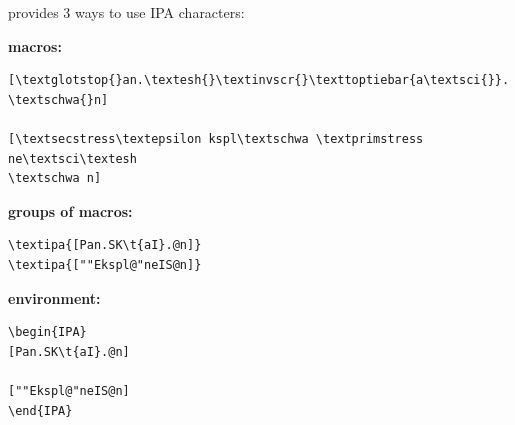 \begin{frame}[fragile]

 provides 3 ways to use IPA characters:


\textbf{macros:}

\begin{lstlisting}
[\textglotstop{}an.\textesh{}\textinvscr{}\texttoptiebar{a\textsci{}}.
\textschwa{}n]

[\textsecstress\textepsilon kspl\textschwa \textprimstress ne\textsci\textesh
\textschwa n]
\end{lstlisting}

\vspace{-.25cm}

\begin{multicols}{2}

\z 
\end{multicols}


\textbf{groups of macros:}

\vspace{-.25cm}

\begin{multicols}{2}
\begin{lstlisting}
\textipa{[Pan.SK\t{aI}.@n]} 
\textipa{[""Ekspl@"neIS@n]}
\end{lstlisting}


\ea \textipa{[Pan.SK\t{aI}.@n]}

\ex {}	
\z 	
\end{multicols}


\textbf{ environment:}

\vspace{-.25cm}

\begin{multicols}{2}
	
\begin{lstlisting}
\begin{IPA}
[Pan.SK\t{aI}.@n]

[""Ekspl@"neIS@n]
\end{IPA}
\end{lstlisting}


\ea	\begin{IPA}
[Pan.SK\t{aI}.@n]
\end{IPA}

\ex \begin{IPA} 
\end{IPA}
\z
\end{multicols}

\nocite{Rei04a}

\nocite{Linke05a}

\end{frame}


